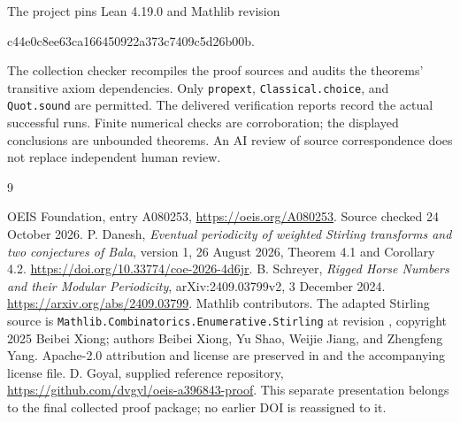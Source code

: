 \documentclass[11pt,a4paper]{article}
\theoremstyle{remark}
\begin{document}
The project pins Lean 4.19.0 and Mathlib revision
\begin{center}\small\ttfamily
c44e0c8ee63ca166450922a373c7409c5d26b00b.
\end{center}
The collection checker recompiles the proof sources and audits the
theorems' transitive axiom dependencies. Only \texttt{propext},
\texttt{Classical.choice}, and \texttt{Quot.sound} are permitted.
The delivered verification reports record the actual successful runs.
Finite numerical checks are corroboration; the displayed conclusions are
unbounded theorems. An AI review of source correspondence does not replace
independent human review.
\begin{thebibliography}{9}
\raggedright
{} OEIS Foundation, entry A080253,
\url{https://oeis.org/A080253}. Source checked 24 October 2026.
 P. Danesh, \emph{Eventual periodicity of weighted
Stirling transforms and two conjectures of Bala}, version 1,
26 August 2026, Theorem 4.1 and Corollary 4.2.
\url{https://doi.org/10.33774/coe-2026-4d6jr}.
 B. Schreyer, \emph{Rigged Horse Numbers and their
Modular Periodicity}, arXiv:2409.03799v2, 3 December 2024.
\url{https://arxiv.org/abs/2409.03799}.
 Mathlib contributors. The adapted Stirling source is
\texttt{Mathlib.Combinatorics.Enumerative.Stirling} at revision
, copyright 2025 Beibei Xiong;
authors Beibei Xiong, Yu Shao, Weijie Jiang, and Zhengfeng Yang.
Apache-2.0 attribution and license are preserved in
 and the accompanying license file.
 D. Goyal, supplied reference repository,
\url{https://github.com/dvgyl/oeis-a396843-proof}.
This separate presentation belongs to the final collected proof package;
no earlier DOI is reassigned to it.
\end{thebibliography}
\end{document}
